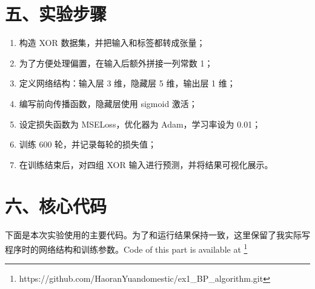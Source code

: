 \documentclass[12pt,a4paper]{ctexart}
\begin{document}
	\section*{五、实验步骤}
	\begin{enumerate}
		\item 构造 XOR 数据集，并把输入和标签都转成张量；
		\item 为了方便处理偏置，在输入后额外拼接一列常数 1；
		\item 定义网络结构：输入层 3 维，隐藏层 5 维，输出层 1 维；
		\item 编写前向传播函数，隐藏层使用 sigmoid 激活；
		\item 设定损失函数为 MSELoss，优化器为 Adam，学习率设为 0.01；
		\item 训练 600 轮，并记录每轮的损失值；
		\item 在训练结束后，对四组 XOR 输入进行预测，并将结果可视化展示。
	\end{enumerate}
	
	\section*{六、核心代码}
	下面是本次实验使用的主要代码。为了和运行结果保持一致，这里保留了我实际写程序时的网络结构和训练参数。Code of this part is available at \footnote{https://github.com/HaoranYuandomestic/ex1\_BP\_algorithm.git}
	
\end{document}
